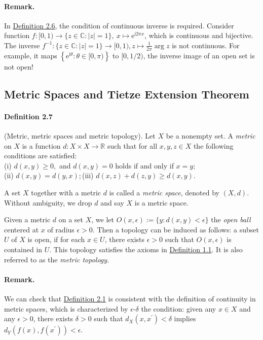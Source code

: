 \documentclass{article}
\numberwithin{equation}{section}
\theoremstyle{plain}
\theoremstyle{definition}
\begin{document}
\paragraph{Remark.} In \hyperref[def:2.6]{Definition 2.6}, the condition of continuous inverse is required. Consider function $f:[0,1)\to\{z\in\mathbb{C}:\vert z\vert = 1\},\ x\mapsto\mathrm{e}^{\mathrm{i}2\pi x}$, which is continuous and bijective. The inverse $f^{-1}:\{z\in\mathbb{C}:\vert z\vert = 1\}\to[0,1),z\mapsto\frac{1}{2\pi}\arg z$ is not continuous. For example, it maps $\left\{\mathrm{e}^{\mathrm{i}\theta}:\theta\in[0,\pi)\right\}$ to $[0,1/2)$, the inverse image of an open set is not open!

\subsection{Metric Spaces and Tietze Extension Theorem\label{subsec:2.2}}

\paragraph{Definition 2.7\label{def:2.7}} (Metric, metric spaces and metric topology). Let $X$ be a nonempty set. A \textit{metric} on $X$ is a function $d:X\times X\to\mathbb{R}$ such that for all $x,y,z\in X$ the following conditions are satisfied:\\
(i) $d(x,y)\geq 0,$ and $d(x,y)=0$ holds if and only if $x=y;$\\
(ii) $d(x,y) = d(y,x);$\quad (iii) $d(x,z) + d(z,y)\geq d(x,y)$.

A set $X$ together with a metric $d$ is called a \textit{metric space}, denoted by $(X,d)$. Without ambiguity, we drop $d$ and say $X$ is a metric space. 

Given a metric $d$ on a set $X$, we let $O(x,\epsilon):=\{y:d(x,y)<\epsilon\}$ the \textit{open ball} centered at $x$ of radius $\epsilon > 0$. Then a topology can be induced as follows: a subset $U$ of $X$ is open, if for each $x\in U$, there exists $\epsilon > 0$ such that $O(x,\epsilon)$ is contained in $U$. This topology satisfies the axioms in \hyperref[def:1.1]{Definition 1.1}. It is also referred to as the \textit{metric topology}.

\paragraph{Remark.} We can check that \hyperref[def:2.1]{Definition 2.1} is consistent with the definition of continuity in metric spaces, which is characterized by $\epsilon$-$\delta$ the condition: given any $x\in X$ and any $\epsilon > 0$, there exists $\delta > 0$ such that $d_X(x,x^\prime)<\delta$ implies $d_Y(f(x),f(x^\prime))<\epsilon$. 
\end{document}
